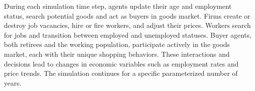 \documentclass[ %
    final,
    scrbook,
    listoffigures,
    listoftables, 
    glossary]{cu-thesis}
\begin{document}
During each simulation time step, agents update their age and employment status, search potential goods and act as buyers in goods market. Firms create or destroy job vacancies, hire or fire workers, and adjust their prices. Workers search for jobs and transition between employed and unemployed statuses. Buyer agents, both retirees and the working population, participate actively in the goods market, each with their unique shopping behaviors. These interactions and decisions lead to changes in economic variables such as employment rates and price trends. The simulation continues for a specific parameterized number of years. %

\end{document}

